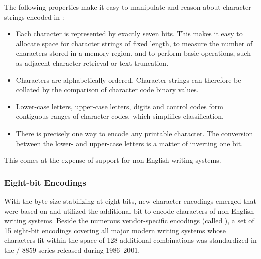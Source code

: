 \documentclass{book}
\begin{document}


The following properties make it easy to manipulate and reason about character
strings encoded in :
\begin{itemize}
  \item Each character is represented by exactly seven bits. This makes it easy
    to allocate space for character strings of fixed length, to measure the
    number of characters stored in a memory region, and to perform basic
    operations, such as adjacent character retrieval or text truncation.
  \item Characters are alphabetically ordered. Character strings can therefore
    be collated by the comparison of character code binary values.
  \item Lower-case letters, upper-case letters, digits and control codes form
    contiguous ranges of character codes, which simplifies classification.
  \item There is precisely one way to encode any printable character. The
    conversion between the lower- and upper-case letters is a matter of
    inverting one bit.
\end{itemize}
This comes at the expense of support for non-English writing systems.

\subsubsection{Eight-bit Encodings}
With the byte size stabilizing at eight bits, new character encodings emerged
that were based on  and utilized the additional bit to encode
characters of non-English writing systems. Beside the numerous vendor-specific
encodings (called ), a set of 15 eight-bit encodings covering
all major modern writing systems whose characters fit within the space of 128
additional combinations was standardized in the
/ 8859 series released during 1986--2001.
\end{document}
